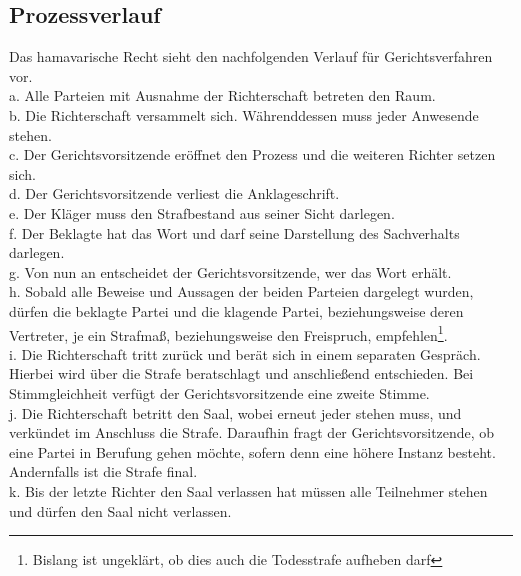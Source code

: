 \documentclass{article}
\begin{document}
\subsection{Prozessverlauf}\label{verlauf}
Das hamavarische Recht sieht den nachfolgenden Verlauf für Gerichtsverfahren vor.\\
a. Alle Parteien mit Ausnahme der Richterschaft betreten den Raum.\\
b. Die Richterschaft versammelt sich. Währenddessen muss jeder Anwesende stehen.\\
c. Der Gerichtsvorsitzende eröffnet den Prozess und die weiteren Richter setzen sich.\\
d. Der Gerichtsvorsitzende verliest die Anklageschrift.\\
e. Der Kläger muss den Strafbestand aus seiner Sicht darlegen.\\
f. Der Beklagte hat das Wort und darf seine Darstellung des Sachverhalts darlegen.\\
g. Von nun an entscheidet der Gerichtsvorsitzende, wer das Wort erhält.\\
h. Sobald alle Beweise und Aussagen der beiden Parteien dargelegt wurden, dürfen die beklagte Partei und die klagende Partei, beziehungsweise deren Vertreter, je ein Strafmaß, beziehungsweise den Freispruch, empfehlen\footnote{Bislang ist ungeklärt, ob dies auch die Todesstrafe aufheben darf}.\\
i. Die Richterschaft tritt zurück und berät sich in einem separaten Gespräch. Hierbei wird über die Strafe beratschlagt und anschließend entschieden. Bei Stimmgleichheit verfügt der Gerichtsvorsitzende eine zweite Stimme.\\
j. Die Richterschaft betritt den Saal, wobei erneut jeder stehen muss, und verkündet im Anschluss die Strafe. Daraufhin fragt der Gerichtsvorsitzende, ob eine Partei in Berufung gehen möchte, sofern denn eine höhere Instanz besteht. Andernfalls ist die Strafe final.\\
k. Bis der letzte Richter den Saal verlassen hat müssen alle Teilnehmer stehen und dürfen den Saal nicht verlassen.
\end{document}

